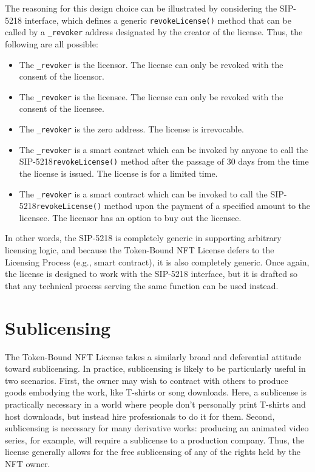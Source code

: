 \documentclass{article}
\newcommand{\eiplicense}{SIP-5218\xspace}
\newcommand{\iccclicense}{Token-Bound NFT License\xspace}
\renewcommand{\code}[1]{\colorbox{light-gray}{\texttt{#1}}}
\begin{document}
The reasoning for this design choice can be illustrated by considering the \eiplicense interface, which defines a generic \code{revokeLicense()} method that can be called by a \code{\_revoker} address designated by the creator of the license. Thus, the following are all possible:
\begin{itemize}
\item The \code{\_revoker} is the licensor. The license can only be revoked with the consent of the licensor.
\item The \code{\_revoker} is the licensee. The license can only be revoked with the consent of the licensee.
\item The \code{\_revoker} is the zero address. The license is irrevocable.
\item The \code{\_revoker} is a smart contract which can be invoked by anyone to call the \eiplicense \code{revokeLicense()} method after the passage of 30 days from the time the license is issued. The license is for a limited time.
\item The \code{\_revoker} is a smart contract which can be invoked to call the \eiplicense \code{revokeLicense()} method upon the payment of a specified amount to the licensee. The licensor has an option to buy out the licensee.
\end{itemize}
In other words, the \eiplicense is completely generic in supporting arbitrary licensing logic, and because the \iccclicense defers to the Licensing Process (e.g., smart contract), it is also completely generic. Once again, the license is designed to work with the \eiplicense interface, but it is drafted so that any technical process serving the same function can be used instead.

\section{Sublicensing}

The \iccclicense takes a similarly broad and deferential attitude toward sublicensing. In practice, sublicensing is likely to be particularly useful in two scenarios. First, the owner may wish to contract with others to produce goods embodying the work, like T-shirts or song downloads. Here, a sublicense is practically necessary in a world where people don't personally print T-shirts and host downloads, but instead hire professionals to do it for them. Second, sublicensing is necessary for many derivative works: producing an animated video series, for example, will require a sublicense to a production company. Thus, the license generally allows for the free sublicensing of any of the rights held by the NFT owner.
\end{document}
